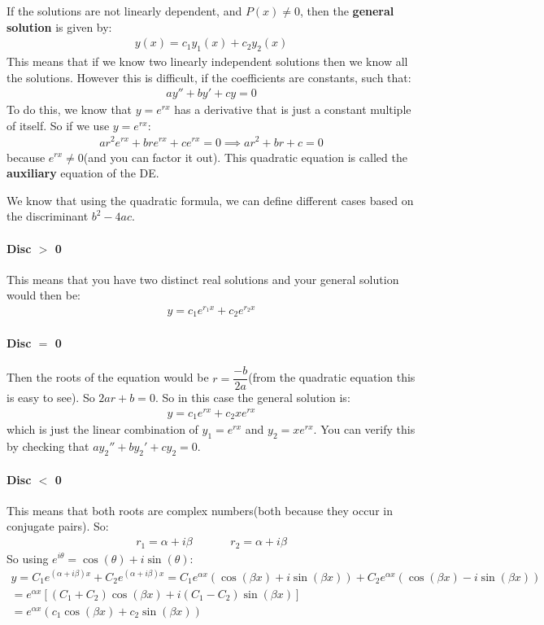 \documentclass{article}
\begin{document}
If the solutions are not linearly dependent, and $P(x) \neq 0$, then the \textbf{general solution} is given by:
\begin{gather*}
    y(x) = c_1y_1(x) + c_2y_2(x)
\end{gather*}
This means that if we know two linearly independent solutions then we know all the solutions. However this is difficult, if the coefficients are constants, such that:
\begin{gather*}
    ay'' + by' + cy = 0
\end{gather*}
To do this, we know that $y = e^{rx}$ has a derivative that is just a constant multiple of itself. So if we use $y = e^{rx}$:
\begin{gather*}
    ar^2e^{rx} + bre^{rx} + ce^{rx} = 0 \implies ar^2 + br + c = 0
\end{gather*}
because $e^{rx} \neq 0$(and you can factor it out). This quadratic equation is called the \textbf{auxiliary} equation of the DE.

We know that using the quadratic formula, we can define different cases based on the discriminant $b^2 - 4ac$.
\paragraph{Disc $>$ 0} This means that you have two distinct real solutions and your general solution would then be:
\begin{gather*}
    y = c_1e^{r_1x}+ c_2e^{r_2x}
\end{gather*}
\paragraph{Disc $=$ 0} Then the roots of the equation would be $r = \dfrac{-b}{2a}$(from the quadratic equation this is easy to see). So $2ar + b = 0$. So in this case the general solution is:
\begin{gather*}
    y = c_1 e^{rx} + c_2 xe^{rx}
\end{gather*}
which is just the linear combination of $y_1 = e^{rx}$ and $y_2 = xe^{rx}$. You can verify this by checking that $ay_2'' + by_2' + cy_2 = 0$.
\paragraph{Disc $<$ 0} This means that both roots are complex numbers(both because they occur in conjugate pairs). So:
\begin{gather*}
    r_1 = \alpha + i \beta\hspace{40pt}r_2 = \alpha + i \beta
\end{gather*}
So using $e^{i\theta} = \cos(\theta) + i\sin(\theta)$:
\begin{gather*}
    y = C_1e^{(\alpha + i \beta)x} + C_2e^{(\alpha + i \beta)x} = C_1e^{\alpha x}(\cos(\beta x) + i\sin(\beta x)) + C_2e^{\alpha x}(\cos(\beta x) - i\sin(\beta x))\\
    = e^{\alpha x}[(C_1 + C_2)\cos(\beta x) + i(C_1 - C_2)\sin(\beta x)]\\
    = e^{\alpha x}(c_1\cos(\beta x) + c_2\sin(\beta x))
\end{gather*}
\end{document}
